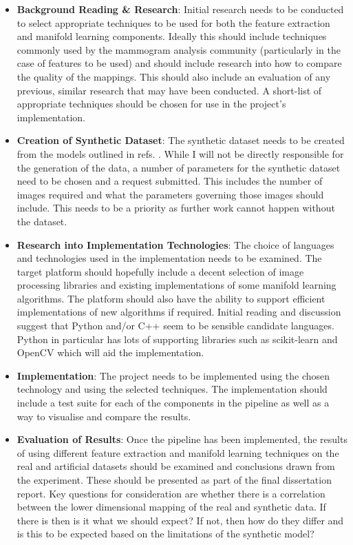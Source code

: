 \documentclass[11pt,fleqn,twoside]{article}
\begin{document}
\begin{itemize}
\item \textbf{Background Reading \& Research}: Initial research needs to be conducted to select appropriate techniques to be used for both the feature extraction and manifold learning components. Ideally this should include techniques commonly used by the mammogram analysis community (particularly in the case of features to be used) and should include research into how to compare the quality of the mappings. This should also include an evaluation of any previous, similar research that may have been conducted. A short-list of appropriate techniques should be chosen for use in the project's implementation.

\item \textbf{Creation of Synthetic Dataset}: The synthetic dataset needs to be created from the models outlined in refs. \cite{bakic2002mammogram1, bakic2002mammogram2, bakic2003mammogram3}. While I will not be directly responsible for the generation of the data, a number of parameters for the synthetic dataset need to be chosen and a request submitted. This includes the number of images required and what the parameters governing those images should include. This needs to be a priority as further work cannot happen without the dataset.

\item \textbf{Research into Implementation Technologies}: The choice of languages and technologies used in the implementation needs to be examined. The target platform should hopefully include a decent selection of image processing libraries and existing implementations of some manifold learning algorithms. The platform should also have the ability to support efficient implementations of new algorithms if required. Initial reading and discussion suggest that Python and/or C++ seem to be sensible candidate languages. Python in particular has lots of supporting libraries such as scikit-learn \cite{scikit-learn-site} and OpenCV \cite{opencv-site} which will aid the implementation.

\item \textbf{Implementation}: The project needs to be implemented using the chosen technology and using the selected techniques. The implementation should include a test suite for each of the components in the pipeline as well as a way to visualise and compare the results.

\item \textbf{Evaluation of Results}: Once the pipeline has been implemented, the results of using different feature extraction and manifold learning techniques on the real and artificial datasets should be examined and conclusions drawn from the experiment. These should be presented as part of the final dissertation report. Key questions for consideration are whether there is a correlation between the lower dimensional mapping of the real and synthetic data. If there is then is it what we should expect? If not, then how do they differ and is this to be expected based on the limitations of the synthetic model?


\end{itemize}
\end{document}
